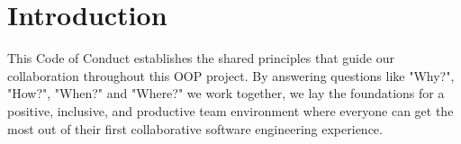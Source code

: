 \section{Introduction}

This Code of Conduct establishes the shared principles that guide our collaboration throughout this OOP project.
By answering questions like "Why?", "How?", "When?" and "Where?" we work together, we lay the foundations for
a positive, inclusive, and productive team environment where everyone can get the most out of their first
collaborative software engineering experience.
